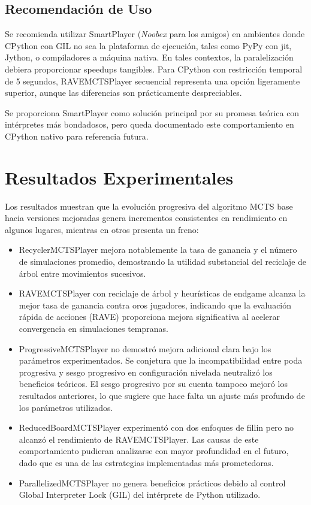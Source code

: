 \documentclass[12pt]{article}
\begin{document}
\subsection{Recomendación de Uso}

Se recomienda utilizar SmartPlayer (\textit{Noobex} para los amigos) en ambientes donde CPython con GIL no sea la plataforma de ejecución, tales como PyPy con jit, Jython, o compiladores a máquina nativa. En tales contextos, la paralelización debiera proporcionar speedups tangibles. Para CPython con restricción temporal de 5 segundos, RAVEMCTSPlayer secuencial representa una opción ligeramente superior, aunque las diferencias son prácticamente despreciables.

Se proporciona SmartPlayer como solución principal por su promesa teórica con intérpretes más bondadosos, pero queda documentado este comportamiento en CPython nativo para referencia futura.

\section{Resultados Experimentales}

Los resultados muestran que la evolución progresiva del algoritmo MCTS base hacia versiones mejoradas genera incrementos consistentes en rendimiento en algunos lugares, mientras en otros presenta un freno:

\begin{itemize}
	\item RecyclerMCTSPlayer mejora notablemente la tasa de ganancia y el número de simulaciones promedio, demostrando la utilidad substancial del reciclaje de árbol entre movimientos sucesivos.
	
	\item RAVEMCTSPlayer con reciclaje de árbol y heurísticas de endgame alcanza la mejor tasa de ganancia contra oros jugadores, indicando que la evaluación rápida de acciones (RAVE) proporciona mejora significativa al acelerar convergencia en simulaciones tempranas.
	
	\item ProgressiveMCTSPlayer no demostró mejora adicional clara bajo los parámetros experimentados. Se conjetura que la incompatibilidad entre poda progresiva y sesgo progresivo en configuración nivelada neutralizó los beneficios teóricos. El sesgo progresivo por su cuenta tampoco mejoró los resultados anteriores, lo que sugiere que hace falta un ajuste más profundo de los parámetros utilizados.
	
	\item ReducedBoardMCTSPlayer experimentó con dos enfoques de fillin pero no alcanzó el rendimiento de RAVEMCTSPlayer. Las causas de este comportamiento pudieran analizarse con mayor profundidad en el futuro, dado que es una de las estrategias implementadas más prometedoras.
	
	\item ParallelizedMCTSPlayer no genera beneficios prácticos debido al control Global Interpreter Lock (GIL) del intérprete de Python utilizado.
\end{itemize}
\end{document}
